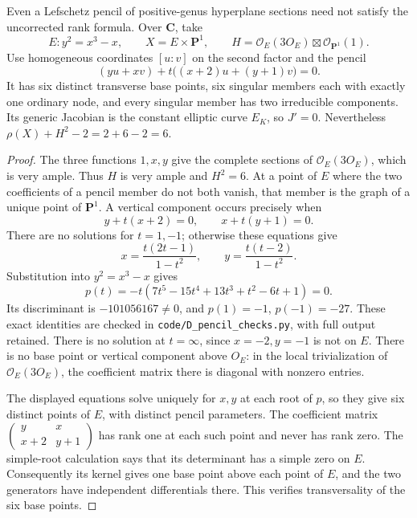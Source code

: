 \begin{proposition}
\label{D:reducible-counterexample}
Even a Lefschetz pencil of positive-genus hyperplane sections need not
satisfy the uncorrected rank formula.  Over $\mathbf C$, take
\[
 E:y^2=x^3-x,\qquad X=E\times\mathbf P^1,
 \qquad H=\mathcal O_E(3O_E)\boxtimes\mathcal O_{\mathbf P^1}(1).
\]
Use homogeneous coordinates $[u:v]$ on the second factor and the pencil
\[
       (yu+xv)+t\bigl((x+2)u+(y+1)v\bigr)=0.
\]
It has six distinct transverse base points, six singular members each
with exactly one ordinary node, and every singular member has two
irreducible components.  Its generic Jacobian is the constant elliptic
curve $E_K$, so $J'=0$.  Nevertheless
$\rho(X)+H^2-2=2+6-2=6$.
\end{proposition}
\begin{proof}
The three functions $1,x,y$ give the complete sections of
$\mathcal O_E(3O_E)$, which is very ample.  Thus $H$ is very ample and
$H^2=6$.  At a point of $E$ where the two coefficients of a pencil member
do not both vanish, that member is the graph of a unique point of
$\mathbf P^1$.  A vertical component occurs precisely when
\[
 y+t(x+2)=0,\qquad x+t(y+1)=0.
\]
There are no solutions for $t=1,-1$; otherwise these equations give
\[
 x=\frac{t(2t-1)}{1-t^2},\qquad
 y=\frac{t(t-2)}{1-t^2}.
\]
Substitution into $y^2=x^3-x$ gives
\[
        p(t)=-t(7t^5-15t^4+13t^3+t^2-6t+1)=0.
\]
Its discriminant is $-101056167\ne0$, and
$p(1)=-1$, $p(-1)=-27$.  These exact identities are checked in
\texttt{code/D\_pencil\_checks.py}, with full output retained.
There is no solution at $t=\infty$, since $x=-2,y=-1$ is not on $E$.
There is no base point or vertical component above $O_E$: in the local
trivialization of $\mathcal O_E(3O_E)$, the coefficient matrix there is
diagonal with nonzero entries.

The displayed equations solve uniquely for $x,y$ at each root of $p$,
so they give six distinct points of $E$, with distinct pencil parameters.
The coefficient matrix
$\left(\begin{smallmatrix}y&x\\x+2&y+1\end{smallmatrix}\right)$ has rank
one at each such point and never has rank zero.  The simple-root
calculation says that its determinant has a simple zero on $E$.
Consequently its kernel gives one base point above each point of $E$,
and the two generators have independent differentials there.  This
verifies transversality of the six base points.


\end{proof}

